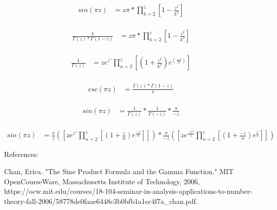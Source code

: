 \documentclass{article}
\begin{document}
\begin{align*}
sin(\pi z) &= z\pi * \prod_{k=2}^z\left[1 - \frac{z^2}{k^2}\right] \\
\end{align*}

\begin{align*}
\frac{\pi}{\Gamma\left(z\right) * \Gamma\left(1 - z\right)} &= z\pi * \prod_{k=2}^z\left[1 - \frac{z^2}{k^2}\right] \\
\end{align*}

\begin{align*}
\frac{1}{\Gamma\left(z\right)} &= ze^z^\gamma \prod_{n=2}^z\left[\left(1 + \frac{z^2}{k^2}\right)e^\left(\frac{-z}{n}\right)\right] \\
\end{align*}

\begin{align*}
csc(\pi z) &= \frac{\Gamma\left(z\right) * \Gamma\left(1 - z\right)}{\pi} \\
\end{align*}

\begin{align*}
sin(\pi z) &= \frac{1}{\Gamma\left(z\right)} * \frac{1}{\Gamma\left(- z\right)} * \frac{\pi}{-z} \\
\end{align*}

\begin{align*}
sin(\pi z) &= \frac{\pi}{z} \left(\left[ze^z^\gamma \prod_{n=2}^z \left[\left(1 + \frac{z}{n}\right)e^\frac{-z}{n}\right]\right]\right) * \frac{\pi}{-z} \left(\left[ze^\frac{-z\gamma}{1} \prod_{n=2}^z \left[\left(1 + \frac{-z}{n}\right)e^\frac{z}{n}\right]\right]\right)
\end{align*}



\newpage
References:

Chan, Erica. "The Sine Product Formula and the Gamma Function." MIT OpenCourseWare, Massachusetts Institute of Technology, 2006, https://ocw.mit.edu/courses/18-104-seminar-in-analysis-applications-to-number-theory-fall-2006/58778de0faae6448c3b0bfb1a1ec4f7a_chan.pdf.
\end{document}
